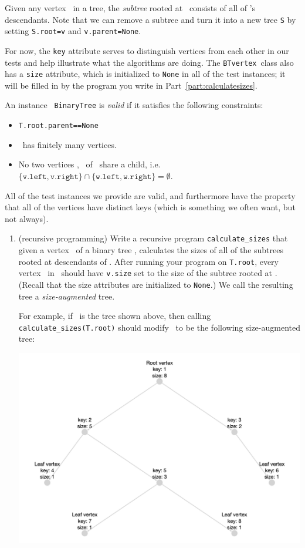 \documentclass[11pt]{article}
\begin{document}
\begin{enumerate}
 Given any vertex \btv\ in a tree, the {\em subtree} rooted at \btv\ consists of all of \btv's descendants.  Note that we can remove a subtree and turn it into a new tree \texttt{S} by setting
 \texttt{S.root=v} and \texttt{v.parent=None}.

 For now, the \texttt{key} attribute serves to distinguish vertices from each other in our tests and help illustrate what the algorithms are doing.  The \texttt{BTvertex}\ class
 also has a \texttt{size} attribute, which is initialized to \texttt{None} in all of the test instances; it will be filled in by the program you write in Part~\ref{part:calculatesizes}.

 An instance \treeT\ \texttt{BinaryTree} is {\em valid} if it satisfies the following constraints: \begin{itemize}
     \item \texttt{T.root.parent==None}
     \item \treeT\ has finitely many vertices.
     \item No two vertices \btv, \btw\ of \treeT\ share a child, i.e. 
     $\{\texttt{v.left},\texttt{v.right}\} \cap \{\texttt{w.left},\texttt{w.right}\} = \emptyset$. 
 \end{itemize}
 All of the test instances we provide are valid, and furthermore have the property that all of the vertices have distinct keys (which is something we often want, but not always).

 \begin{enumerate}
 \item \label{part:calculatesizes} (recursive programming)
 Write a recursive program \texttt{calculate\_sizes} that given a vertex \btv\ of a binary tree \treeT, calculates the sizes of all of the subtrees rooted at descendants of \btv.  After running your program on \texttt{T.root}, every vertex \btv\ in \treeT\ should have \texttt{v.size} set to the size of the subtree rooted at \btv. (Recall that the size attributes are initialized to \texttt{None}.)  We call the resulting tree a {\em size-augmented} tree.
 
For example, if \treeT\  is the  tree shown above, 
then calling \texttt{calculate\_sizes(T.root)} should modify  \treeT\ to be the following size-augmented tree:

 \includegraphics[scale=.175]{ps0-assets/p0_q1_BT_after.png}


\end{enumerate}
\end{enumerate}
\end{document}
